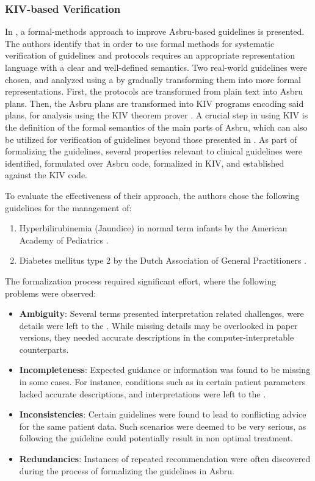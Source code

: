 \subsubsection{KIV-based Verification}\label{sec:kiv-verification}

In \cite{TenAIM06}, a formal-methods approach to improve Asbru-based guidelines
is presented. The authors identify that in order to use formal methods
for systematic verification of guidelines and protocols requires
an appropriate representation language with a clear and well-defined semantics.
Two real-world guidelines were chosen, and analyzed using a
by gradually transforming them into more formal representations.
First, the protocols are transformed from plain text into Asbru plans. Then,
the Asbru plans are transformed into KIV programs encoding said plans, for analysis
using the KIV theorem prover \cite{BalserFASE00}. A crucial step in using
KIV is the definition of the formal semantics of the main parts of Asbru,
which can also be utilized for verification of guidelines beyond those
presented in \cite{TenAIM06}. As part of formalizing the guidelines,
several properties relevant to clinical guidelines were identified,
formulated over Asbru code, formalized in KIV, and established against
the KIV code.

To evaluate the effectiveness of their approach, the authors chose the following
guidelines for the management of:
\begin{enumerate}[label=(\alph*)]
  \item Hyperbilirubinemia (Jaundice) in normal term infants by the American
    Academy of Pediatrics \cite{JaundiceAAP94}.
  \item Diabetes mellitus type 2 by the Dutch Association of General
    Practitioners \cite{RuttenNHG99}.
\end{enumerate}
The formalization process required significant effort, where the
following problems were observed:
\begin{itemize}
  \item \textbf{Ambiguity}: Several terms presented interpretation
    related challenges, were details were left to the \HCP{}. While
    missing details may be overlooked in paper versions, they needed
    accurate descriptions in the computer-interpretable counterparts.
  \item \textbf{Incompleteness}: Expected guidance or information
    was found to be missing in some cases. For instance, conditions
    such as  in certain patient parameters lacked
    accurate descriptions, and interpretations were left to the \HCPs{}.
  \item \textbf{Inconsistencies}: Certain guidelines were found to lead
    to conflicting advice for the same patient data. Such scenarios
    were deemed to be very serious, as following the guideline could
    potentially result in non optimal treatment.
  \item \textbf{Redundancies}: Instances of repeated recommendation were
    often discovered during the process of formalizing the guidelines in Asbru.
\end{itemize}

